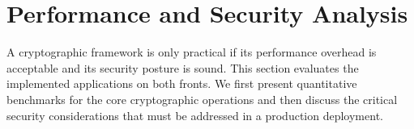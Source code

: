 \documentclass[12pt, letterpaper]{article}
\begin{document}

\section{Performance and Security Analysis}
A cryptographic framework is only practical if its performance overhead is acceptable and its security posture is sound. This section evaluates the implemented applications on both fronts. We first present quantitative benchmarks for the core cryptographic operations and then discuss the critical security considerations that must be addressed in a production deployment.
\end{document}
